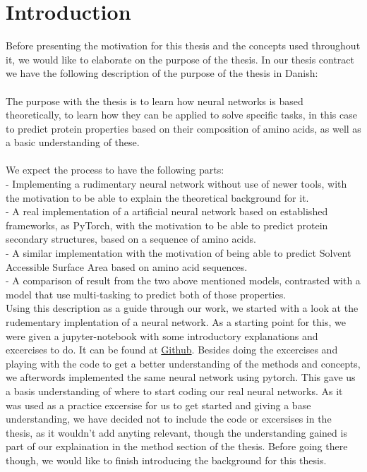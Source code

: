 \section{Introduction}
Before presenting the motivation for this thesis and the concepts used throughout it, we would like to elaborate on the purpose of the thesis. In our thesis contract we have the following description of the purpose of the thesis in Danish:\\\\
The purpose with the thesis is to learn how neural networks is based theoretically, to learn how they can be applied to solve specific tasks, in this case to predict protein properties based on their composition of amino acids, as well as a basic understanding of these. \\\\
We expect the process to have the following parts:\\
- Implementing a rudimentary neural network without use of newer tools, with the motivation to be able to explain the theoretical background for it.\\
- A real implementation of a artificial neural network based on established frameworks, as PyTorch, with the motivation to be able to predict protein secondary structures, based on a sequence of amino acids. \\
- A similar implementation with the motivation of being able to predict Solvent Accessible Surface Area based on amino acid sequences. \\
- A comparison of result from the two above mentioned models, contrasted with a model that use multi-tasking to predict both of those properties.\\ 

Using this description as a guide through our work, we started with a look at the rudementary implentation of a neural network. As a starting point for this, we were given a jupyter-notebook with some introductory explanations and excercises to do.
It can be found at \href{https://github.com/dennybritz/nn-from-scratch/blob/master/nn-from-scratch.ipynb}{Github}.
Besides doing the excercises and playing with the code to get a better understanding of the methods and concepts, we afterwords implemented the same neural network using pytorch. 
This gave us a basis understanding of where to start coding our real neural networks. As it was used as a practice excersise for us to get started and giving a base understanding, we have decided not to include the code or excersises in the thesis, as it wouldn't add anyting relevant, though the understanding gained is part of our explaination in the method section of the thesis. Before going there though, we would like to finish introducing the background for this thesis.

